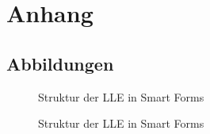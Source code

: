 \chapter{Anhang}
\section{Abbildungen}

\begin{figure}[ht]
	\centering
	\caption{Struktur der \acs{LLE} in Smart Forms}
	\label{AN:Smart1}
\end{figure}

\restoregeometry

\begin{figure}[ht]
	\centering
	\caption{Struktur der \acs{LLE} in Smart Forms}
	\label{AN:Smart2}
\end{figure}

